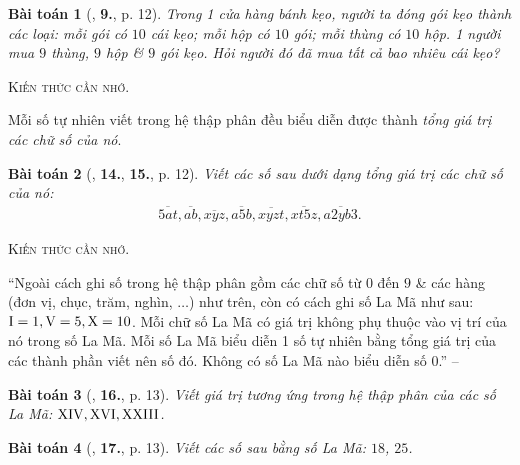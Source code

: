 \documentclass{article}
\numberwithin{equation}{section}
\newtheorem{baitoan}{Bài toán}[section]
\begin{document}
\begin{baitoan}[\cite{Trong_Toan_6_2021}, \textbf{9.}, p. 12]
	Trong 1 cửa hàng bánh kẹo, người ta đóng gói kẹo thành các loại: mỗi gói có $10$ cái kẹo; mỗi hộp có $10$ gói; mỗi thùng có $10$ hộp. 1 người mua $9$ thùng, $9$ hộp \& $9$ gói kẹo. Hỏi người đó đã mua tất cả bao nhiêu cái kẹo?
\end{baitoan}
\noindent\textsc{Kiến thức cần nhớ.}
\begin{tcolorbox}
	Mỗi số tự nhiên viết trong hệ thập phân đều biểu diễn được thành \textit{tổng giá trị các chữ số của nó}. 
\end{tcolorbox}

\begin{baitoan}[\cite{Trong_Toan_6_2021}, \textbf{14.}, \textbf{15.}, p. 12]
	Viết các số sau dưới dạng tổng giá trị các chữ số của nó:
	\begin{align*}
		\overline{5at},\overline{ab},\overline{xyz},\overline{a5b},\overline{xyzt},\overline{xt5z},\overline{a2yb3}.
	\end{align*}
\end{baitoan}
\noindent\textsc{Kiến thức cần nhớ.}
\begin{tcolorbox}
	``Ngoài cách ghi số trong hệ thập phân gồm các chữ số từ $0$ đến $9$ \& các hàng (đơn vị, chục, trăm, nghìn, $\ldots$) như trên, còn có cách ghi số La Mã như sau: $\rm I = 1,V = 5,X = 10$. Mỗi chữ số La Mã có giá trị không phụ thuộc vào vị trí của nó trong số La Mã. Mỗi số La Mã biểu diễn 1 số tự nhiên bằng tổng giá trị của các thành phần viết nên số đó. Không có số La Mã nào biểu diễn số $0$.'' -- \cite[p. 13]{Trong_Toan_6_2021}
\end{tcolorbox}

\begin{baitoan}[\cite{Trong_Toan_6_2021}, \textbf{16.}, p. 13]
	Viết giá trị tương ứng trong hệ thập phân của các số La Mã: $\rm XIV,XVI,XXIII$.
\end{baitoan}

\begin{baitoan}[\cite{Trong_Toan_6_2021}, \textbf{17.}, p. 13]
	Viết các số sau bằng số La Mã: $18$, $25$.
\end{baitoan}
\end{document}
